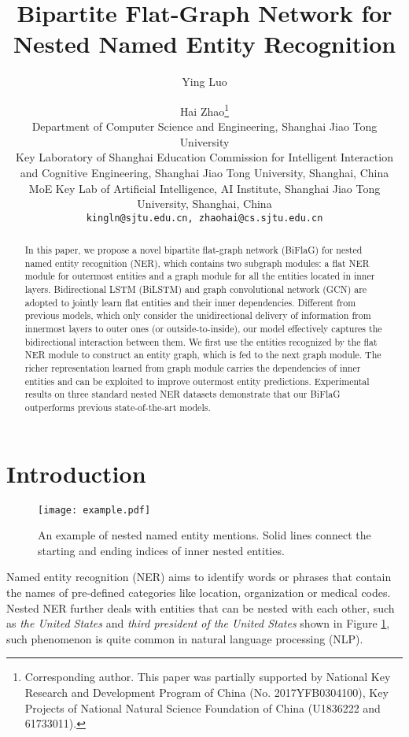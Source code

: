 \documentclass[11pt,a4paper]{article}
\title{Bipartite Flat-Graph Network for Nested Named Entity Recognition}
\author{Ying Luo \and Hai Zhao\thanks{ Corresponding author. This paper was partially supported by National Key Research and Development Program of China (No. 2017YFB0304100), Key Projects of National Natural Science Foundation of China (U1836222 and 61733011).}\\
Department of Computer Science and Engineering, Shanghai Jiao Tong University \\
Key Laboratory of Shanghai Education Commission for Intelligent Interaction \\ and Cognitive Engineering, Shanghai Jiao Tong University, Shanghai, China\\
MoE Key Lab of Artificial Intelligence, AI Institute, Shanghai Jiao Tong University, Shanghai, China\\
{\tt kingln@sjtu.edu.cn, zhaohai@cs.sjtu.edu.cn}
}
\date{}
\begin{document}
\maketitle
\begin{abstract}

In this paper, we propose a novel bipartite flat-graph network (BiFlaG) for nested named entity recognition (NER), which contains two subgraph modules: a flat NER module for outermost entities and a graph module for all the entities located in inner layers.
Bidirectional LSTM (BiLSTM) and graph convolutional network (GCN) are adopted to
jointly learn flat entities and their inner dependencies.
Different from previous models, which only consider the unidirectional delivery of information from innermost layers to outer ones (or outside-to-inside), our model effectively captures the bidirectional interaction between them. 
We first use the entities recognized by the flat NER module to construct an entity graph, which is fed to the next graph module. 
The richer representation learned from graph module carries the dependencies of inner entities and can be exploited to improve outermost entity predictions.
Experimental results on three standard nested NER datasets demonstrate that our BiFlaG outperforms previous state-of-the-art models.

\end{abstract}


\section{Introduction}

\begin{figure}[!t]
  \centering 
  \texttt{[image: example.pdf]}
    \caption{An example of nested named entity mentions. Solid lines connect the starting and ending indices of inner nested entities.}\label{example}
\end{figure} 

Named entity recognition (NER) aims to identify words or phrases that contain the names of pre-defined categories like location, organization or medical codes. Nested NER further deals with entities that can be nested with each other, such as \textit{the United States} and \textit{third president of the United States} shown in Figure \ref{example}, such phenomenon is quite common in natural language processing (NLP). 
\end{document}
